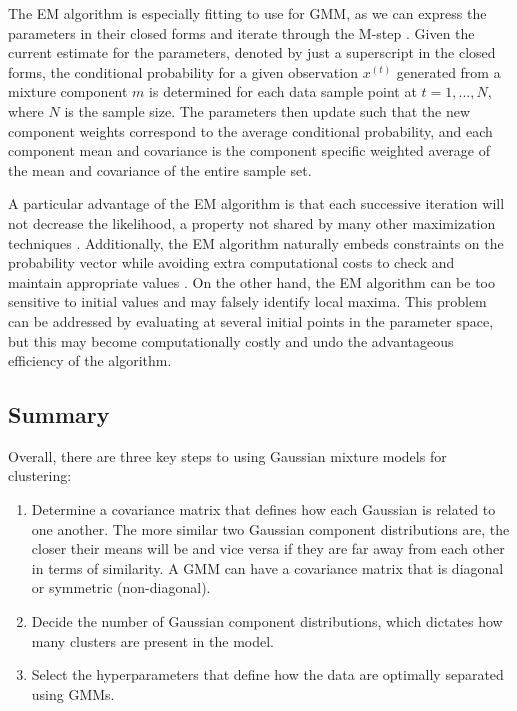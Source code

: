 \documentclass[12pt]{article}
\begin{document}
The EM algorithm is especially fitting to use for GMM, as we can express
the parameters in their closed forms and iterate through the M-step
\citep{do2008expectation}. Given the current estimate for the
parameters, denoted by just a superscript in the closed forms, the
conditional probability for a given observation \(x^{(t)}\) generated
from a mixture component \(m\) is determined for each data sample point
at \(t=1, ..., N\), where \(N\) is the sample size. The parameters then
update such that the new component weights correspond to the average
conditional probability, and each component mean and covariance is the
component specific weighted average of the mean and covariance of the
entire sample set.

A particular advantage of the EM algorithm is that each successive
iteration will not decrease the likelihood, a property not shared by
many other maximization techniques \citep{reynolds2009gaussian}.
Additionally, the EM algorithm naturally embeds constraints on the
probability vector while avoiding extra computational costs to check and
maintain appropriate values \citep{yu2015gaussian}. On the other hand,
the EM algorithm can be too sensitive to initial values and may falsely
identify local maxima. This problem can be addressed by evaluating at
several initial points in the parameter space, but this may become
computationally costly and undo the advantageous efficiency of the
algorithm.

\hypertarget{summary}{%
\subsection{Summary}\label{summary}}

Overall, there are three key steps to using Gaussian mixture models for
clustering:

\begin{enumerate}
\def\labelenumi{\arabic{enumi}.}
\item
  Determine a covariance matrix that defines how each Gaussian is
  related to one another. The more similar two Gaussian component
  distributions are, the closer their means will be and vice versa if
  they are far away from each other in terms of similarity. A GMM can
  have a covariance matrix that is diagonal or symmetric (non-diagonal).
\item
  Decide the number of Gaussian component distributions, which dictates
  how many clusters are present in the model.
\item
  Select the hyperparameters that define how the data are optimally
  separated using GMMs.
\end{enumerate}
\end{document}
